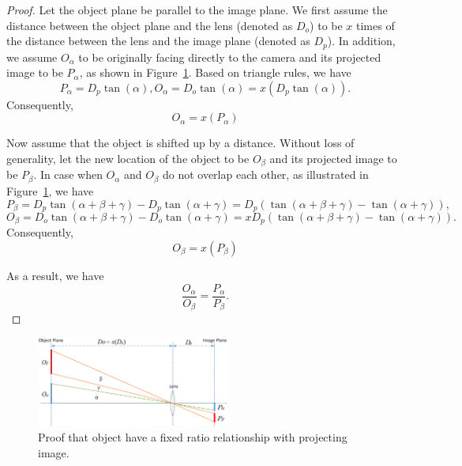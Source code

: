 \begin{proof}
   Let the object plane be parallel to the image plane. We first assume the distance between the object plane and the lens (denoted as $D_o$) to be $x$ times of the distance between the lens and the image plane (denoted as $D_p$). In addition, we assume $O_\alpha$ to be originally facing directly to the camera and its projected image to be $P_\alpha$, as shown in Figure~\ref{fig-proof-projection}.
   Based on triangle rules, we have
    \[P_\alpha=D_p\tan(\alpha),O_\alpha=D_o\tan(\alpha)=x(D_p\tan(\alpha)).\] Consequently,
    \[O_\alpha=x(P_\alpha)\]

   Now assume that the object is shifted up by a distance. Without loss of generality, let the new location of the object to be $O_\beta$ and its projected image to be $P_\beta$.
   In case when $O_\alpha$ and $O_\beta$ do not overlap each other, as illustrated in Figure~\ref{fig-proof-projection}, we have
    \[P_\beta=D_p\tan(\alpha+\beta+\gamma)-D_p\tan(\alpha+\gamma)=D_p(\tan(\alpha+\beta+\gamma)-\tan(\alpha+\gamma)),\]
    \[O_\beta=D_o\tan(\alpha+\beta+\gamma)-D_o\tan(\alpha+\gamma)=xD_p(\tan(\alpha+\beta+\gamma)-\tan(\alpha+\gamma)).\] Consequently,
    \[O_\beta=x(P_\beta)\]

    As a result, we have
    \[\frac{O_\alpha}{O_\beta}=\frac{P_\alpha}{P_\beta}.\]
\end{proof}
\begin{figure}
  \vspace{-20pt}
  \begin{center}
    \includegraphics[width=2.5in]{fig/fig-proof-projection.eps}
  \end{center}
  \vspace{-20pt}
  \caption{Proof that object have a fixed ratio relationship with projecting image.}\label{fig-proof-projection}
  \vspace{-20pt}
\end{figure}

